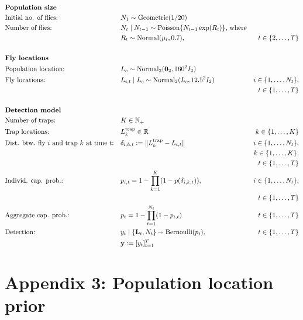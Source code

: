\documentclass[
  oneside]{book}
\begin{document}
\[
\renewcommand{\baselinestretch}{1}\normalsize
\begin{aligned}
&\textbf{Population size} \\
&\text{Initial no. of flies:} && N_1  \sim \mathrm{Geometric}(1/20) \\
& \text{Number of flies:}~ && N_t \mid N_{t-1}  \sim \mathrm{Poisson}\{ N_{t-1} \exp(R_t) \} \text{, where} \\ & && R_t \sim \mathrm{Normal}(\mu_t, 0.7), & t \in \{2, \ldots, T \} \\
\\
&\textbf{Fly locations} \\
& \text{Population location:} ~ && L_c \sim \mathrm{Normal_2}(\mathbf 0_2, 160^2 I_2) \\
& \text{Fly locations:}~ && L_{i,t} \mid L_c \sim \mathrm{Normal}_2(L_c, 12.5^2 I_2) & i \in \{1, \ldots, N_t\}, \\
  &&&& t \in \{1, \ldots, T\}\\
\\
&\textbf{Detection model} \\
& \text{Number of traps:}~ && K \in \mathbb N_+ \\
& \text{Trap locations:}~ && L_k^\text{trap} \in \mathbb R & k \in \{1, \ldots, K\} \\
& \text{Dist. btw. fly } i \text{ and trap } k \text{ at time } t \text{:} && \delta_{i,k,t} := \lVert L_k^\text{trap} - L_{i,t} \rVert & i \in \{1, \ldots, N_t\}, \\
  &&&& k \in \{1, \ldots, K\}, \\
  &&&& t \in \{1, \ldots, T\}\\
& \text{Individ. cap. prob.:} && p_{i, t} = 1 - \prod_{k=1}^K (1 - p(\delta_{i,k,t})), & i \in \{1, \ldots, N_t\}, \\
  &&&& t \in \{1, \ldots, T\} \\
& \text{Aggregate cap. prob.:} && p_t = 1 - \prod_{t=1}^{N_t} (1 - p_{i,t}) & t \in \{1, \ldots, T\} \\
&\text{Detection:}~ && y_t \mid \{ \mathbf L_t, N_t \} \sim \operatorname{Bernoulli}(p_t), & t \in \{1, \ldots, T\} \\
  &&& \mathbf y := [y_t]_{t=1}^T
\end{aligned}
\renewcommand{\baselinestretch}{1}\normalsize
\]

\hypertarget{appendix-3-population-location-prior}{%
\section{Appendix 3: Population location prior}\label{appendix-3-population-location-prior}}
\end{document}

